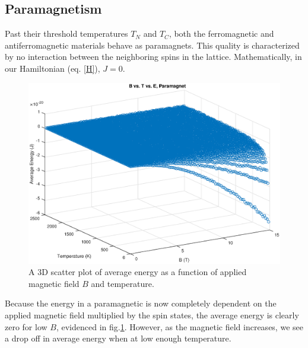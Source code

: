 \documentclass[12pt]{article}
\begin{document}
\subsection*{Paramagnetism}
Past their threshold temperatures $T_N$ and $T_C$, both the ferromagnetic and antiferromagnetic materials behave as paramagnets.  This quality is characterized by no interaction between the neighboring spins in the lattice. \cite{magnettypes, fromjesse} Mathematically, in our Hamiltonian (eq. \ref{H}), $J=0$. \cite{magnettypes}

\begin{figure}[!h]
\includegraphics[width=\linewidth]{./Paragraphs/paraEsurf.eps}
\caption{A 3D scatter plot of average energy as a function of applied magnetic field $B$ and temperature.}
\label{paraEsurf}
\end{figure}
Because the energy in a paramagnetic is now completely dependent on the applied magnetic field multiplied by the spin states, the average energy is clearly zero for low $B$, evidenced in fig.\ref{paraEsurf}.  However, as the magnetic field increases, we see a drop off in average energy when at low enough temperature.
\end{document}
